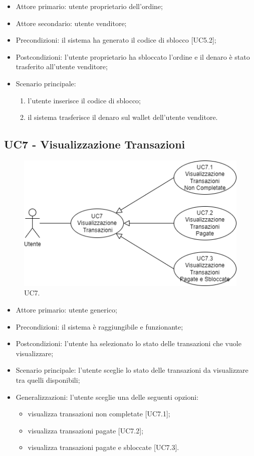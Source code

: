 \begin{itemize}
    \item Attore primario: utente proprietario dell'ordine;
    \item Attore secondario: utente venditore;
    \item Precondizioni: il sistema ha generato il codice di sblocco [UC5.2];
    \item Postcondizioni: l'utente proprietario ha sbloccato l'ordine e il denaro è stato trasferito all'utente venditore;
    \item Scenario principale:
    \begin{enumerate}
        \item l'utente inserisce il codice di sblocco;
        \item il sistema trasferisce il denaro sul wallet dell'utente venditore.
    \end{enumerate}
\end{itemize}

\subsection{UC7 - Visualizzazione Transazioni}

\begin{figure}[H]
    \centering
    \includegraphics[scale=0.7]{immagini/UseCases-UC7.png}
    \caption{UC7.}
  \end{figure}

\begin{itemize}
    \item Attore primario: utente generico;
    \item Precondizioni: il sistema è raggiungibile e funzionante;
    \item Postcondizioni: l'utente ha selezionato lo stato delle transazioni che vuole visualizzare;
    \item Scenario principale: l'utente sceglie lo stato delle transazioni da visualizzare tra quelli disponibili;
    \item Generalizzazioni: l'utente sceglie una delle seguenti opzioni:
    \begin{itemize}
        \item visualizza transazioni non completate [UC7.1];
        \item visualizza transazioni pagate [UC7.2];
        \item visualizza transazioni pagate e sbloccate [UC7.3].
    \end{itemize}
\end{itemize}

